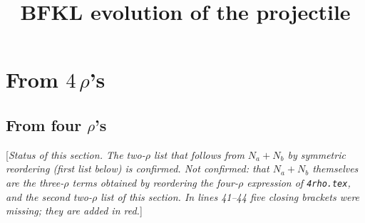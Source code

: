 \documentclass[9pt]{article}
\title{BFKL evolution of the projectile}
\author{}
\date{}
\numberwithin{equation}{section}
\newcommand{\rnote}[1]{{\color{teal}[\textit{#1}]}}
\begin{document}
\maketitle
\section{From $4$\,$\rho$'s}
\subsection{From four $\rho$'s}
\rnote{Status of this section. The two-$\rho$ list that follows from $N_{a}+N_{b}$ by symmetric reordering (first list below) is confirmed. Not confirmed: that $N_{a}+N_{b}$ themselves are the three-$\rho$ terms obtained by reordering the four-$\rho$ expression of \texttt{4rho.tex}, and the second two-$\rho$ list of this section. In lines 41--44 five closing brackets were missing; they are added in red.}
\end{document}
